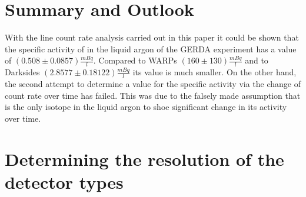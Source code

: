 \documentclass[encoding=utf8,british]{tumphthesis}
\begin{document}


\chapter{Summary and Outlook}
\label{sec:ConcAndOutlook}

With the line count rate analysis carried out in this paper it could be shown that the specific activity of  in the liquid argon of the GERDA experiment has a value of $(0.508\pm0.0857) \frac{\unit{mBq}}{\unit{l}}$. 
Compared to WARPs $(160\pm130)\frac{\unit{mBq}}{\unit{l}}$ and to Darksides $(2.8577 \pm 0.18122) \frac{\unit{mBq}}{\unit{l}}$ its value is much smaller.
On the other hand, the second attempt to determine a value for the specific activity via the change of count rate over time has failed.
This was due to the falsely made assumption that \Kr is the only isotope in the liquid argon to shoe significant change in its activity over time.





\appendix
\chapter{Determining the resolution of the detector types}
\label{sec:ResDetermination}





\backmatter

\printbibliography
\end{document}
